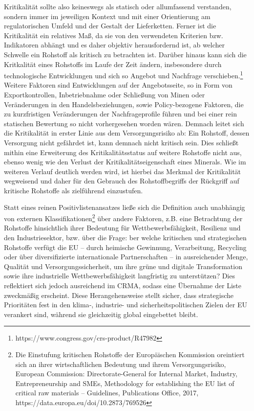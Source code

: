 \documentclass[12pt,a4paper,oneside]{book} %
\begin{document}
Kritikalität sollte also keineswegs als statisch oder allumfassend verstanden, sondern immer im jeweiligen Kontext und mit einer Orientierung am regulatorischen Umfeld und der Gestalt der Lieferketten. Ferner ist die Kritikalität ein relatives Maß, da sie von den verwendeten Kriterien bzw. Indikatoren abhängt und es daher objektiv herausfordernd ist, ab welcher Schwelle ein Rohstoff als kritisch zu betrachten ist.\autocite{IWm Rohstoffe für die Industrie , S. 11} Darüber hinaus kann sich die Kritkalität eines Rohstoffs im Laufe der Zeit ändern, insbesondere durch technologische Entwicklungen und sich so Angebot und Nachfrage verschieben.\footnote{https://www.congress.gov/crs-product/R47982} Weitere Faktoren sind Entwicklungen auf der Angebotsseite, so in Form von Exportkontrollen, Inbetriebnahme oder Schließung von Minen oder Veränderungen in den Handelsbeziehungen, sowie Policy-bezogene Faktoren, die zu kurzfristigen Veränderungen der Nachfrageprofile führen und bei einer rein statischen Bewertung so nicht vorhergesehen worden wären.\autocite{PE 786.415, S. 29}
Demnach leitet sich die Kritikalität in erster Linie aus dem Versorgungsrisiko ab: Ein Rohstoff, dessen Versorgung nicht gefährdet ist, kann demnach nicht kritisch sein. Dies schließt mithin eine Erweiterung des Kritikalitätsstatus auf weitere Rohstoffe nicht aus, ebenso wenig wie den Verlust der Kritikalitätseigenschaft eines Minerals. Wie im weiteren Verlauf deutlich werden wird, ist hierbei das Merkmal der Kritikalität wegweisend und daher für den Gebrauch des Rohstoffbegriffs der Rückgriff auf kritische Rohstoffe als zielführend einzustufen.
	
Statt eines reinen Positivlistenansatzes ließe sich die Definition auch unabhängig von externen Klassifikationen\footnote{Die Einstufung kritischen Rohstoffe der Europäischen Kommission oreintiert sich an ihrer wirtschaftlichen Bedeutung und ihrem Versorgungsrisiko, European Commission: Directorate-General for Internal Market, Industry, Entrepreneurship and SMEs, Methodology for establishing the EU list of critical raw materials – Guidelines, Publications Office, 2017, https://data.europa.eu/doi/10.2873/769526 } über andere Faktoren, z.B. eine Betrachtung der Rohstoffe hinsichtlich ihrer Bedeutung für Wettbewerbsfähigkeit, Resilienz und den Industriesektor, bzw. über die Frage: ber welche kritischen und strategischen Rohstoffe verfügt die EU – durch heimische Gewinnung, Verarbeitung, Recycling oder über diversifizierte internationale Partnerschaften – in ausreichender Menge, Qualität und Versorgungssicherheit, um ihre grüne und digitale Transformation sowie ihre industrielle Wettbewerbsfähigkeit langfristig zu unterstützen? Dies reflektiert sich jedoch ausreichend im CRMA, sodass eine Übernahme der Liste zweckmäßig erscheint. Diese Herangehensweise stellt sicher, dass strategische Prioritäten fest in den klima‑, industrie- und sicherheitspolitischen Zielen der EU verankert sind, während sie gleichzeitig global eingebettet bleibt.
	
\end{document}
